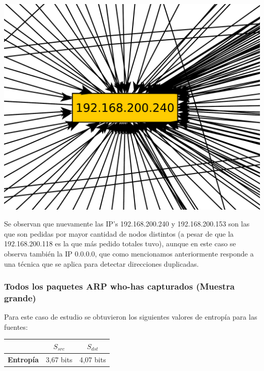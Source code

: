 \begin{center}
\includegraphics[scale=0.3,clip=true,trim=20 0 0 0]{graphics/laburomediano254.pdf}
\end{center}

\indent Se observan que nuevamente las IP's 192.168.200.240 y 192.168.200.153 son las que son pedidas por mayor cantidad de nodos distintos (a pesar de que la 192.168.200.118 es la que más pedido totales tuvo), aunque en este caso se observa también la IP 0.0.0.0, que como mencionamos anteriormente responde a una técnica que se aplica para detectar direcciones duplicadas.\\



\subsubsection{Todos los paquetes ARP who-has capturados (Muestra grande)}

\indent \indent Para este caso de estudio se obtuvieron los siguientes valores de entropía para las fuentes:\\

\begin{center}
	\begin{tabular}{ | c | c | c |} \hline
	   & \textbf{$S_{src}$} & \textbf{$S_{dst}$} \\ \hline
	  	\textbf{Entropía} & 3,67 bits & 4,07 bits \\ \hline
	\end{tabular}
\end{center}


